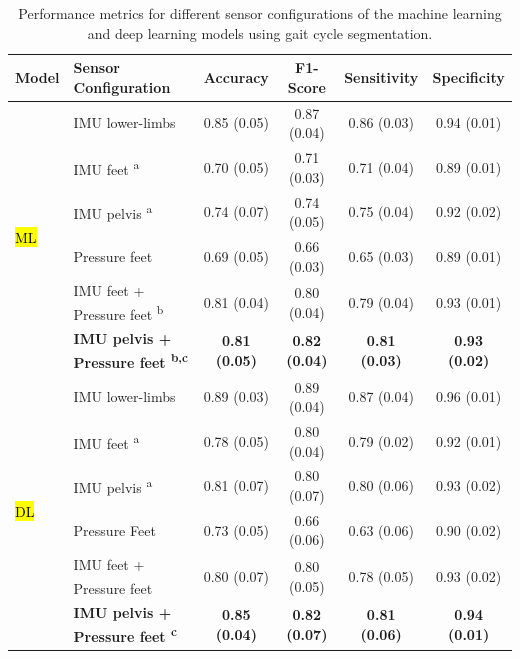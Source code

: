\documentclass[sensors,article,accept,pdftex,moreauthors]{Definitions/mdpi}
\begin{document}
\begin{table}[H]
\small
\setlength{\tabcolsep}{2.25mm}
\caption{Performance metrics for different sensor configurations of the machine learning and deep learning models using gait cycle segmentation. }
{
\begin{tabular}{llcccc}
\toprule
Model & Sensor Configuration & Accuracy & F1-Score & Sensitivity & Specificity \\ 
\midrule
\multirow{6}{*}{\hl{ML %
}} 
& IMU lower-limbs        & 0.85 (0.05) & 0.87 (0.04) & 0.86 (0.03) & 0.94 (0.01) \\
& IMU feet \textsuperscript{a} & 0.70 (0.05) & 0.71 (0.03) & 0.71 (0.04) & 0.89 (0.01) \\
& IMU pelvis \textsuperscript{a} & 0.74 (0.07) & 0.74 (0.05) & 0.75 (0.04) & 0.92 (0.02)\\
& Pressure feet          & 0.69 (0.05) & 0.66 (0.03) & 0.65 (0.03) & 0.89 (0.01) \\
& IMU feet + Pressure feet \textsuperscript{b} & 0.81 (0.04) & 0.80 (0.04) & 0.79 (0.04) & 0.93 (0.01) \\
& \textbf{IMU pelvis + Pressure feet \textsuperscript{b,c}}              & \textbf{0.81 (0.05)}  & \textbf{0.82 (0.04)} & \textbf{0.81 (0.03)}  &  \textbf{0.93 (0.02)}\\
\midrule
\multirow{6}{*}{\hl{DL}} 
& IMU lower-limbs               & 0.89 (0.03) & 0.89 (0.04) & 0.87 (0.04) & 0.96 (0.01)\\
& IMU feet \textsuperscript{a}                     & 0.78 (0.05) & 0.80 (0.04) & 0.79 (0.02) & 0.92 (0.01)\\
& IMU pelvis \textsuperscript{a}                    & 0.81 (0.07) & 0.80 (0.07) & 0.80 (0.06) & 0.93 (0.02)\\
& Pressure Feet                 & 0.73 (0.05) & 0.66 (0.06) & 0.63 (0.06) & 0.90 (0.02)\\
& IMU feet + Pressure feet \textsuperscript{}      & 0.80 (0.07) & 0.80 (0.05) & 0.78 (0.05) & 0.93 (0.02)\\
& \textbf{IMU pelvis + Pressure feet \textsuperscript{c}}         & \textbf{0.85 (0.04) } & \textbf{0.82 (0.07)} & \textbf{0.81 (0.06)}  & \textbf{0.94 (0.01)} \\
\bottomrule
\end{tabular}
}


\end{table}
\end{document}
